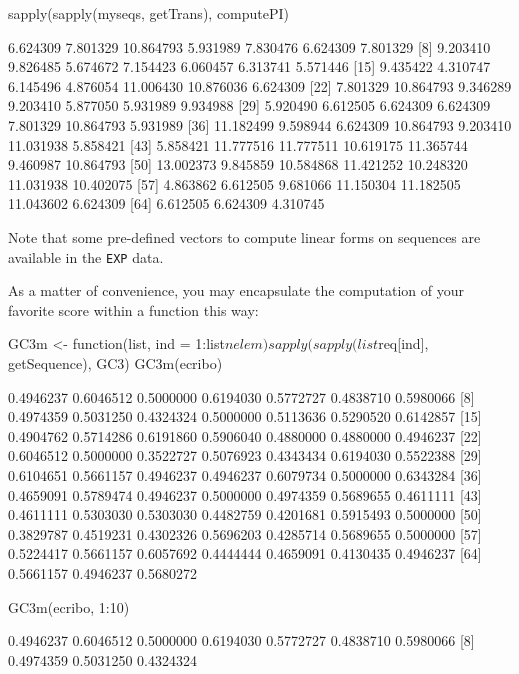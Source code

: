 \documentclass{article}
\begin{document}
\begin{Schunk}
\begin{Sinput}
 sapply(sapply(myseqs, getTrans), computePI)
\end{Sinput}
\begin{Soutput}
 [1]  6.624309  7.801329 10.864793  5.931989  7.830476  6.624309  7.801329
 [8]  9.203410  9.826485  5.674672  7.154423  6.060457  6.313741  5.571446
[15]  9.435422  4.310747  6.145496  4.876054 11.006430 10.876036  6.624309
[22]  7.801329 10.864793  9.346289  9.203410  5.877050  5.931989  9.934988
[29]  5.920490  6.612505  6.624309  6.624309  7.801329 10.864793  5.931989
[36] 11.182499  9.598944  6.624309 10.864793  9.203410 11.031938  5.858421
[43]  5.858421 11.777516 11.777511 10.619175 11.365744  9.460987 10.864793
[50] 13.002373  9.845859 10.584868 11.421252 10.248320 11.031938 10.402075
[57]  4.863862  6.612505  9.681066 11.150304 11.182505 11.043602  6.624309
[64]  6.612505  6.624309  4.310745
\end{Soutput}
\end{Schunk}

Note that some pre-defined vectors to compute linear forms on sequences are
available in the \texttt{EXP} data.

As a matter of convenience, you may encapsulate the computation of your favorite score 
within a function this way:

\begin{Schunk}
\begin{Sinput}
 GC3m <- function(list, ind = 1:list$nelem) sapply(sapply(list$req[ind], 
     getSequence), GC3)
 GC3m(ecribo)
\end{Sinput}
\begin{Soutput}
 [1] 0.4946237 0.6046512 0.5000000 0.6194030 0.5772727 0.4838710 0.5980066
 [8] 0.4974359 0.5031250 0.4324324 0.5000000 0.5113636 0.5290520 0.6142857
[15] 0.4904762 0.5714286 0.6191860 0.5906040 0.4880000 0.4880000 0.4946237
[22] 0.6046512 0.5000000 0.3522727 0.5076923 0.4343434 0.6194030 0.5522388
[29] 0.6104651 0.5661157 0.4946237 0.4946237 0.6079734 0.5000000 0.6343284
[36] 0.4659091 0.5789474 0.4946237 0.5000000 0.4974359 0.5689655 0.4611111
[43] 0.4611111 0.5303030 0.5303030 0.4482759 0.4201681 0.5915493 0.5000000
[50] 0.3829787 0.4519231 0.4302326 0.5696203 0.4285714 0.5689655 0.5000000
[57] 0.5224417 0.5661157 0.6057692 0.4444444 0.4659091 0.4130435 0.4946237
[64] 0.5661157 0.4946237 0.5680272
\end{Soutput}
\begin{Sinput}
 GC3m(ecribo, 1:10)
\end{Sinput}
\begin{Soutput}
 [1] 0.4946237 0.6046512 0.5000000 0.6194030 0.5772727 0.4838710 0.5980066
 [8] 0.4974359 0.5031250 0.4324324
\end{Soutput}
\end{Schunk}
\end{document}
